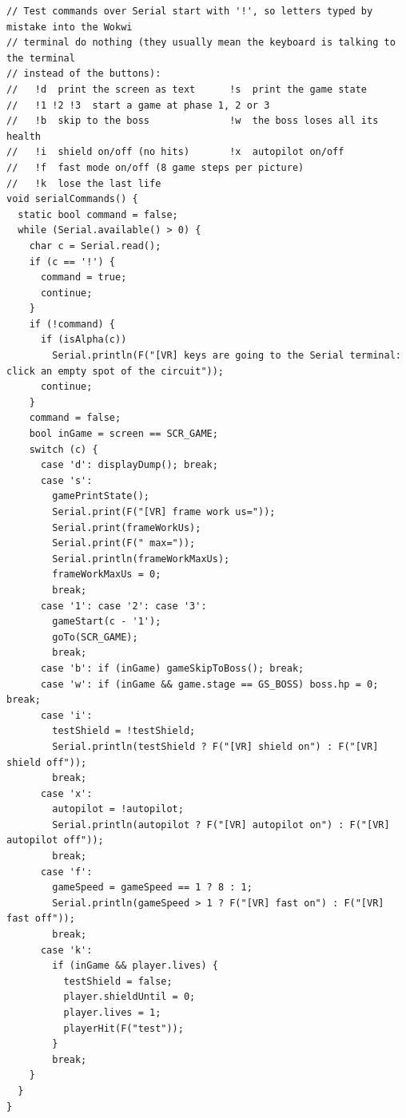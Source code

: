 \documentclass[11pt,a4paper]{article}
\begin{document}
\begin{latin}
\begin{lstlisting}[language=Arduino]
// Test commands over Serial start with '!', so letters typed by mistake into the Wokwi
// terminal do nothing (they usually mean the keyboard is talking to the terminal
// instead of the buttons):
//   !d  print the screen as text      !s  print the game state
//   !1 !2 !3  start a game at phase 1, 2 or 3
//   !b  skip to the boss              !w  the boss loses all its health
//   !i  shield on/off (no hits)       !x  autopilot on/off
//   !f  fast mode on/off (8 game steps per picture)
//   !k  lose the last life
void serialCommands() {
  static bool command = false;
  while (Serial.available() > 0) {
    char c = Serial.read();
    if (c == '!') {
      command = true;
      continue;
    }
    if (!command) {
      if (isAlpha(c))
        Serial.println(F("[VR] keys are going to the Serial terminal: click an empty spot of the circuit"));
      continue;
    }
    command = false;
    bool inGame = screen == SCR_GAME;
    switch (c) {
      case 'd': displayDump(); break;
      case 's':
        gamePrintState();
        Serial.print(F("[VR] frame work us="));
        Serial.print(frameWorkUs);
        Serial.print(F(" max="));
        Serial.println(frameWorkMaxUs);
        frameWorkMaxUs = 0;
        break;
      case '1': case '2': case '3':
        gameStart(c - '1');
        goTo(SCR_GAME);
        break;
      case 'b': if (inGame) gameSkipToBoss(); break;
      case 'w': if (inGame && game.stage == GS_BOSS) boss.hp = 0; break;
      case 'i':
        testShield = !testShield;
        Serial.println(testShield ? F("[VR] shield on") : F("[VR] shield off"));
        break;
      case 'x':
        autopilot = !autopilot;
        Serial.println(autopilot ? F("[VR] autopilot on") : F("[VR] autopilot off"));
        break;
      case 'f':
        gameSpeed = gameSpeed == 1 ? 8 : 1;
        Serial.println(gameSpeed > 1 ? F("[VR] fast on") : F("[VR] fast off"));
        break;
      case 'k':
        if (inGame && player.lives) {
          testShield = false;
          player.shieldUntil = 0;
          player.lives = 1;
          playerHit(F("test"));
        }
        break;
    }
  }
}


\end{lstlisting}
\end{latin}
\end{document}
